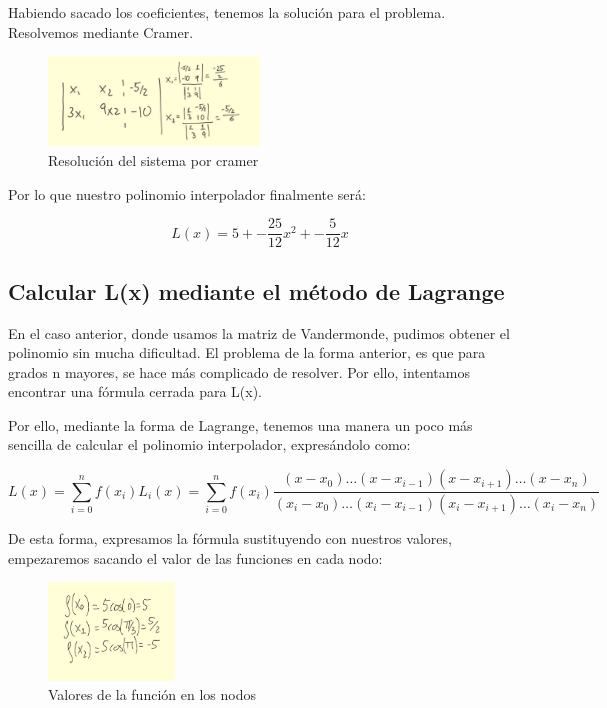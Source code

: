 \documentclass{article}
\begin{document}
Habiendo sacado los coeficientes, tenemos la solución para el problema. Resolvemos mediante Cramer.

\begin{figure}[h]
	\center
	\includegraphics[width=0.5\textwidth]{src/cramer.jpg}
	\caption{Resolución del sistema por cramer}
\end{figure}

Por lo que nuestro polinomio interpolador finalmente será:

\begin{equation}
  L(x) = 5 + -\frac{25}{12}x^{2} + -\frac{5}{12}x
\end{equation}

\newpage


\subsection{Calcular L(x) mediante el método de Lagrange}

En el caso anterior, donde usamos la matriz de Vandermonde, pudimos obtener el polinomio sin mucha dificultad. El problema de la forma anterior, es que para grados n mayores, se hace más complicado de resolver. Por ello, intentamos encontrar una fórmula cerrada para L(x).

Por ello, mediante la forma de Lagrange, tenemos una manera un poco más sencilla de calcular el polinomio interpolador, expresándolo como:

\begin{equation}
  L(x) = \sum_{i=0}^{n} f(x_i) L_i(x) = \sum_{i=0}^{n} f(x_i) \frac{(x - x_0) \dots (x - x_{i-1})(x - x_{i+1}) \dots (x - x_n)}{(x_i - x_0) \dots (x_i - x_{i-1})(x_i - x_{i+1}) \dots (x_i - x_n)}
\end{equation}

De esta forma, expresamos la fórmula sustituyendo con nuestros valores, empezaremos sacando el valor de las funciones en cada nodo:

\begin{figure}[h]
  \center
  \includegraphics[width=0.3\textwidth]{src/lagrangefis.jpg}
  \caption{Valores de la función en los nodos}
\end{figure} 
  
\end{document}
